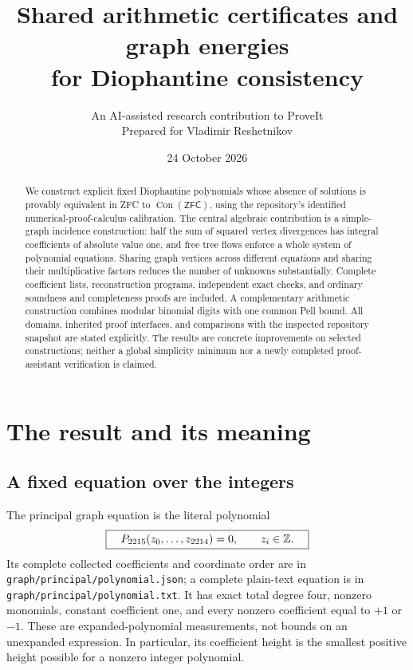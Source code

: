 \documentclass[11pt]{article}
\title{Shared arithmetic certificates and graph energies\\for Diophantine consistency}
\author{An AI-assisted research contribution to ProveIt\\Prepared for Vladimir Reshetnikov}
\date{24 October 2026}
\theoremstyle{definition}\newtheorem{definition}[theorem]{Definition}
\theoremstyle{remark}\newtheorem{remark}[theorem]{Remark}
\newcommand{\Z}{\mathbb Z}\newcommand{\N}{\mathbb N}
\newcommand{\Con}{\operatorname{Con}}\newcommand{\ZFC}{\mathsf{ZFC}}
\newcommand{\file}[1]{\nolinkurl{#1}}
\begin{document}
\maketitle
\begin{abstract}
We construct explicit fixed Diophantine polynomials whose absence of solutions
is provably equivalent in ZFC to $\Con(\ZFC)$, using the repository's identified
numerical-proof-calculus calibration. The central algebraic contribution is a
simple-graph incidence construction: half the sum of squared vertex divergences
has integral coefficients of absolute value one, and free tree flows enforce a
whole system of polynomial equations. Sharing graph vertices across different
equations and sharing their multiplicative factors reduces the number of
unknowns substantially. Complete coefficient lists, reconstruction programs,
independent exact checks, and ordinary soundness and completeness proofs are
included. A complementary arithmetic construction combines modular binomial
digits with one common Pell bound. All domains, inherited proof interfaces,
and comparisons with the inspected repository snapshot are stated explicitly.
The results are concrete improvements on selected constructions; neither a
global simplicity minimum nor a newly completed proof-assistant verification
is claimed.
\end{abstract}
\tableofcontents
\newpage

\section{The result and its meaning}
\label{sec:result}

\subsection{A fixed equation over the integers}
The principal graph equation is the literal polynomial
\[
  \boxed{\quad P_{\GraphVars}(z_0,\ldots,z_{\GraphLast})=0,
                  \qquad z_i\in\Z.\quad}
\]
Its complete collected coefficients and coordinate order are in
\file{graph/principal/polynomial.json}; a complete plain-text equation is in
\file{graph/principal/polynomial.txt}. It has exact total degree four,
\GraphTerms{} nonzero monomials, constant coefficient one, and every nonzero
coefficient equal to $+1$ or $-1$. These are expanded-polynomial measurements,
not bounds on an unexpanded expression. In particular, its coefficient height
is the smallest positive height possible for a nonzero integer polynomial.
\end{document}
